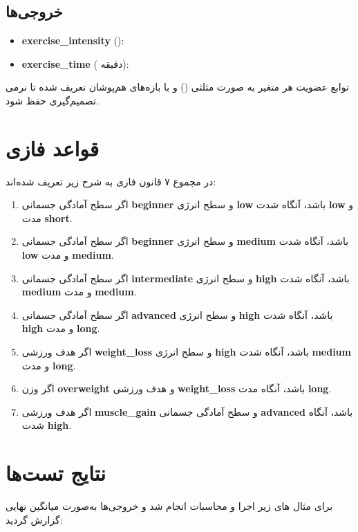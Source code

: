 \documentclass[12pt]{exam}
\begin{document}
	\subsection{خروجی‌ها}
	\begin{itemize}
		\item \textbf{exercise\_intensity} ():   
		\item \textbf{exercise\_time} ( دقیقه):   
	\end{itemize}
	
	توابع عضویت هر متغیر به صورت مثلثی () و با بازه‌های هم‌پوشان تعریف شده تا نرمی تصمیم‌گیری حفظ شود.
	
	\section{قواعد فازی}
	در مجموع ۷ قانون فازی به شرح زیر تعریف شده‌اند:
	\begin{enumerate}
		\item اگر سطح آمادگی جسمانی \textbf{beginner} و سطح انرژی \textbf{low} باشد،  
		آنگاه شدت \textbf{low} و مدت \textbf{short}.
		\item اگر سطح آمادگی جسمانی \textbf{beginner} و سطح انرژی \textbf{medium} باشد،  
		آنگاه شدت \textbf{low} و مدت \textbf{medium}.
		\item اگر سطح آمادگی جسمانی \textbf{intermediate} و سطح انرژی \textbf{high} باشد،  
		آنگاه شدت \textbf{medium} و مدت \textbf{medium}.
		\item اگر سطح آمادگی جسمانی \textbf{advanced} و سطح انرژی \textbf{high} باشد،  
		آنگاه شدت \textbf{high} و مدت \textbf{long}.
		\item اگر هدف ورزشی \textbf{weight\_loss} و سطح انرژی \textbf{high} باشد،  
		آنگاه شدت \textbf{medium} و مدت \textbf{long}.
		\item اگر وزن \textbf{overweight} و هدف ورزشی \textbf{weight\_loss} باشد،  
		آنگاه مدت \textbf{long}.
		\item اگر هدف ورزشی \textbf{muscle\_gain} و سطح آمادگی جسمانی \textbf{advanced} باشد،  
		آنگاه شدت \textbf{high}.
	\end{enumerate}
	
	\section{نتایج تست‌ها}
	برای مثال های زیر اجرا و محاسبات انجام شد و خروجی‌ها به‌صورت میانگین نهایی گزارش گردید:
	
\end{document}
